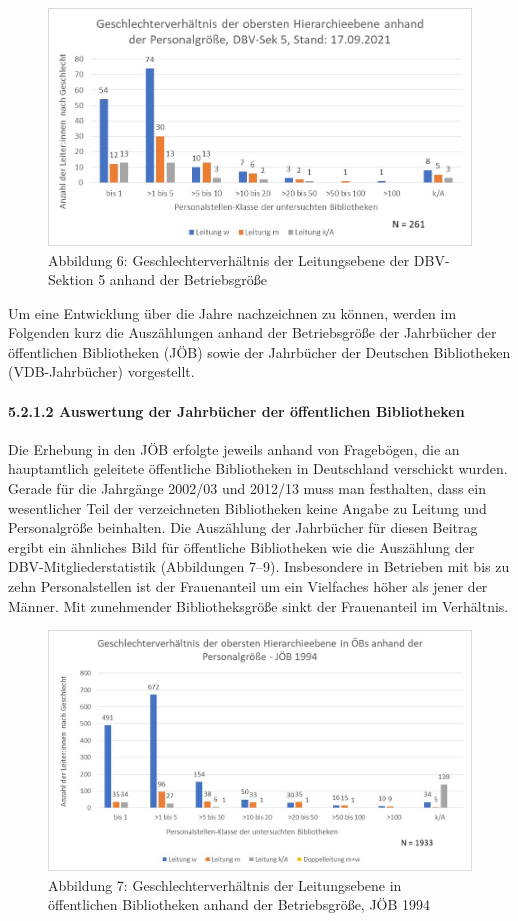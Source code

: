 \documentclass[a4paper,
fontsize=11pt,
oneside,
numbers=noperiodatend,
parskip=half-,
bibliography=totoc,
final
]{scrartcl}
\begin{document}
\begin{figure}
\centering
\includegraphics{img/Abb_06_DBV-Sek5.jpg}
\caption{Abbildung 6: Geschlechterverhältnis der Leitungsebene der
DBV-Sektion 5 anhand der Betriebsgröße}
\end{figure}

Um eine Entwicklung über die Jahre nachzeichnen zu können, werden im
Folgenden kurz die Auszählungen anhand der Betriebsgröße der Jahrbücher
der öffentlichen Bibliotheken (JÖB) sowie der Jahrbücher der Deutschen
Bibliotheken (VDB-Jahrbücher) vorgestellt.

\paragraph{5.2.1.2 Auswertung der Jahrbücher der öffentlichen Bibliotheken}

Die Erhebung in den JÖB erfolgte jeweils anhand von Fragebögen, die an
hauptamtlich geleitete öffentliche Bibliotheken in Deutschland
verschickt wurden. Gerade für die Jahrgänge 2002/03 und 2012/13 muss man
festhalten, dass ein wesentlicher Teil der verzeichneten Bibliotheken
keine Angabe zu Leitung und Personalgröße beinhalten. Die Auszählung der
Jahrbücher für diesen Beitrag ergibt ein ähnliches Bild für öffentliche
Bibliotheken wie die Auszählung der DBV-Mitgliederstatistik (Abbildungen
7--9). Insbesondere in Betrieben mit bis zu zehn Personalstellen ist der
Frauenanteil um ein Vielfaches höher als jener der Männer. Mit
zunehmender Bibliotheksgröße sinkt der Frauenanteil im Verhältnis.

\begin{figure}
\centering
\includegraphics{img/Abb_07_JOB-1994.jpg}
\caption{Abbildung 7: Geschlechterverhältnis der Leitungsebene in
öffentlichen Bibliotheken anhand der Betriebsgröße, JÖB 1994}
\end{figure}
\end{document}

